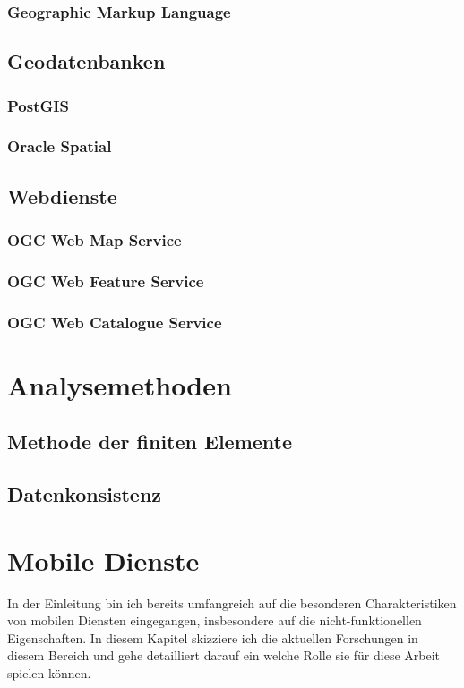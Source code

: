 \subsubsection{Geographic Markup Language}
\subsection{Geodatenbanken}
\subsubsection{PostGIS}
\subsubsection{Oracle Spatial}
\subsection{Webdienste}
\subsubsection{OGC Web Map Service}
\subsubsection{OGC Web Feature Service}
\subsubsection{OGC Web Catalogue Service}

\section{Analysemethoden}
\subsection{Methode der finiten Elemente}
\subsection{Datenkonsistenz}

\section{Mobile Dienste}
In der Einleitung bin ich bereits umfangreich auf die besonderen Charakteristiken von mobilen Diensten eingegangen, insbesondere auf die nicht-funktionellen Eigenschaften. In diesem Kapitel skizziere ich die aktuellen Forschungen in diesem Bereich und gehe detailliert darauf ein welche Rolle sie für diese Arbeit spielen können.

